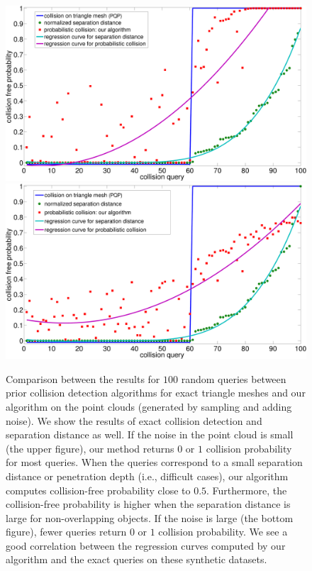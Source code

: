 \begin{figure}[htb]
  \centering
  \includegraphics[width=0.79\linewidth]{figs/7/smallnoise.pdf}
  \includegraphics[width=0.79\linewidth]{figs/7/largenoise.pdf}
  \caption[Comparison between the results for $100$ random queries between prior collision detection algorithms for exact triangle meshes and our
  algorithm on the point clouds]{\label{fig:7:res1} Comparison between the results for $100$ random queries between prior collision detection algorithms for exact triangle meshes and our
  algorithm on the point clouds (generated by sampling and adding noise). We show the results of exact collision detection and separation distance as well. If the noise in
  the point cloud is small (the upper figure), our method returns $0$ or $1$ collision probability for most queries. When the queries correspond to a small separation distance or penetration depth (i.e., difficult cases), our algorithm computes collision-free probability close to $0.5$.
  Furthermore, the collision-free probability is higher when the separation distance is large for non-overlapping objects. If
  the noise is large (the bottom figure), fewer queries return $0$ or $1$ collision probability. We see a good correlation between the regression
  curves computed by our algorithm and the exact queries on these synthetic datasets.}
\end{figure}

